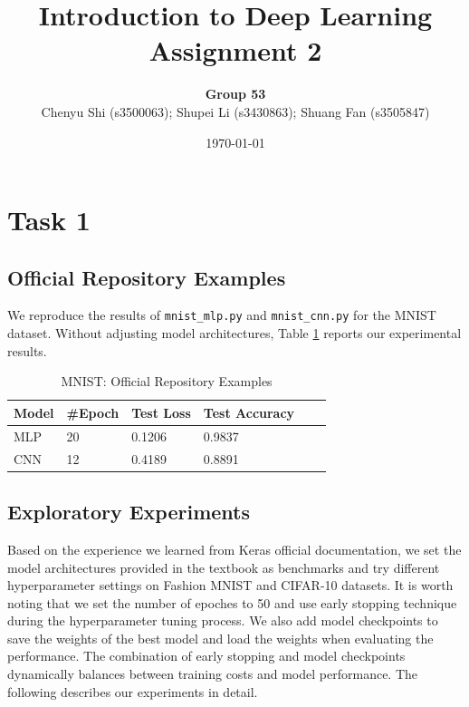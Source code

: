 \documentclass{article}
\title{Introduction to Deep Learning\\Assignment 2} %
\author{\textbf{Group 53}\\Chenyu Shi (s3500063); Shupei Li (s3430863); Shuang Fan (s3505847)} %
\date{\today} %
\begin{document}

\maketitle %

\section*{Task 1}
\setcounter{section}{1}
\setcounter{subsection}{0}
\subsection{Official Repository Examples}
We reproduce the results of \texttt{mnist\_mlp.py} and \texttt{mnist\_cnn.py} for the MNIST dataset. Without adjusting model architectures, Table \ref{tab:1-offer} reports our experimental results.
\begin{table}[!ht]
    \centering
    \caption{MNIST: Official Repository Examples}
    \label{tab:1-offer}
    \begin{tabular}{llllll}
        \toprule
        \textbf{Model} & \textbf{\#Epoch} & \textbf{Test Loss} & \textbf{Test Accuracy}\\
        \midrule
        MLP & 20 & 0.1206 & 0.9837\\
        CNN & 12 & 0.4189 & 0.8891\\
        \bottomrule
    \end{tabular}
\end{table}

\subsection{Exploratory Experiments}
Based on the experience we learned from Keras official documentation, we set the model architectures provided in the textbook as benchmarks and try different hyperparameter settings on Fashion MNIST and CIFAR-10 datasets. It is worth noting that we set the number of epoches to 50 and use early stopping technique during the hyperparameter tuning process. We also add model checkpoints to save the weights of the best model and load the weights when evaluating the performance. The combination of early stopping and model checkpoints dynamically balances between training costs and model performance. The following describes our experiments in detail.
\end{document}
